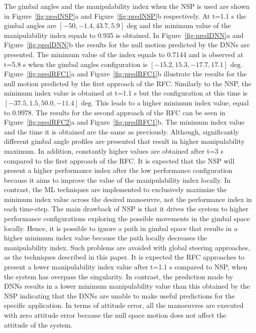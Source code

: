 \documentclass[aerospace,article,submit,moreauthors,dvi2pdf]{Definitions/mdpi}
\begin{document}
The gimbal angles and the manipulability index when the NSP is used are shown in Figure~\ref{fig:predNSP}a and Figure~\ref{fig:predNSP}b respectively. At t=1.1 s the gimbal angles are $[ -50,  -1.4,   43.7 ,   5.9]$ $ \text{deg}$ and the minimum value of the manipulability index equals to 0.935 is obtained. In Figure~\ref{fig:predDNN}a and Figure~\ref{fig:predDNN}b the results for the null motion predicted by the DNNs are presented. The minimum value of the index equals to 0.7144 and is observed at t=5.8 s when the gimbal angles configuration is $[-15.2, 15.3, -17.7, 17.1]$ $\text{deg}$. Figure~\ref{fig:predRFC1}a and Figure~\ref{fig:predRFC1}b illustrate the results for the null motion predicted by the first approach of the RFC. Similarly to the NSP, the minimum index value is obtained at t=1.1 s but the configuration at this time is $[-37.5  ,  1.5 ,  50.0 , -11.4]$ $\text{deg}$. This leads to a higher minimum index value, equal to 0.9978. The results for the second approach of the RFC can be seen in Figure~\ref{fig:predRFC2}a and Figure~\ref{fig:predRFC1}b. The minimum index value and the time it is obtained are the same as previously. Although, significantly different gimbal angle profiles are presented that result in higher manipulability maximum. In addition, constantly higher values are obtained after t=3 s compared to the first approach of the RFC.
It is expected that the NSP will present a higher performance index after the low performance configuration because it aims to improve the value of the manipulability index locally. In contrast, the ML techniques are implemented to exclusively maximize the minimum index value across the desired manoeuvre, not the performance index in each time-step. The main drawback of NSP is that it drives the system to higher performance configurations exploring the possible movements in the gimbal space locally. Hence, it is possible to ignore a path in gimbal space that results in a higher minimum index value because the path locally decreases the manipulability index. Such problems are avoided with global steering approaches, as the techniques described in this paper. It is expected the RFC approaches to present a lower manipulability index value after t=1.1 s compared to NSP, when the system has overpass the singularity. In contrast, the prediction made by DNNs results in a lower minimum manipulability value than this obtained by the NSP indicating that the DNNs are unable to make useful predictions for the specific application.
In terms of attitude error, all the manoeuvres are executed with zero attitude error because the null space motion does not affect the attitude of the system. 
\end{document}
